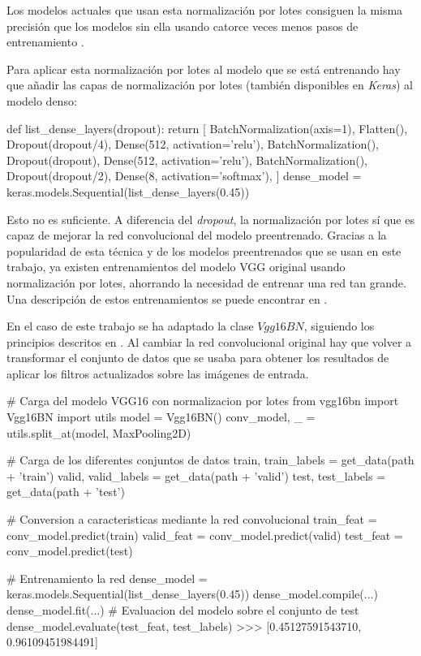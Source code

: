 Los modelos actuales que usan esta normalización por lotes consiguen la misma
precisión que los modelos sin ella usando catorce veces menos pasos de
entrenamiento \parencite{batch_normalization}.

Para aplicar esta normalización por lotes al modelo que se está entrenando hay
que añadir las capas de normalización por lotes (también disponibles en
\textit{Keras}) al modelo denso:

\begin{python}
def list_dense_layers(dropout):
    return [
        BatchNormalization(axis=1),
        Flatten(),
        Dropout(dropout/4),
        Dense(512, activation='relu'),
        BatchNormalization(),
        Dropout(dropout),
        Dense(512, activation='relu'),
        BatchNormalization(),
        Dropout(dropout/2),
        Dense(8, activation='softmax'),
    ]
dense_model = keras.models.Sequential(list_dense_layers(0.45))
\end{python}

Esto no es suficiente. A diferencia del \textit{dropout}, la normalización por
lotes sí que es capaz de mejorar la red convolucional del modelo preentrenado.
Gracias a la popularidad de esta técnica y de los modelos preentrenados que se
usan en este trabajo, ya existen entrenamientos del modelo VGG original usando
normalización por lotes, ahorrando la necesidad de entrenar una red tan grande.
Una descripción de estos entrenamientos se puede encontrar en
\parencite{pretrained_with_bn}.

En el caso de este trabajo se ha adaptado la clase $Vgg16BN$, siguiendo
los principios descritos en \parencite{fastai}. Al cambiar la red convolucional
original hay que volver a transformar el conjunto de datos que se usaba para
obtener los resultados de aplicar los filtros actualizados sobre las imágenes
de entrada.

\begin{python}
# Carga del modelo VGG16 con normalizacion por lotes
from vgg16bn import Vgg16BN
import utils
model = Vgg16BN()
conv_model, _ = utils.split_at(model, MaxPooling2D)

# Carga de los diferentes conjuntos de datos
train, train_labels = get_data(path + 'train')
valid, valid_labels = get_data(path + 'valid')
test, test_labels = get_data(path + 'test')

# Conversion a caracteristicas mediante la red convolucional
train_feat = conv_model.predict(train)
valid_feat = conv_model.predict(valid)
test_feat = conv_model.predict(test)

# Entrenamiento la red
dense_model = keras.models.Sequential(list_dense_layers(0.45))
dense_model.compile(...)
dense_model.fit(...)
# Evaluacion del modelo sobre el conjunto de test
dense_model.evaluate(test_feat, test_labels)
>>> [0.45127591543710, 0.96109451984491]
\end{python}

